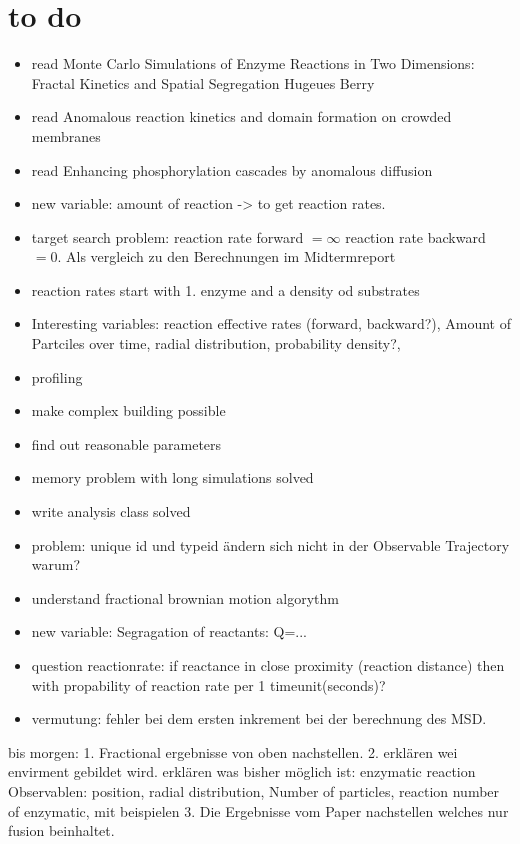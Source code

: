 \documentclass[
  a4paper,BCOR10mm,oneside,
  bibtotoc,idxtotoc,
  headsepline,footsepline,%
  fleqn,openbib
]{scrbook}
\begin{document}
\section{to do}
\begin{itemize}
 \item read Monte Carlo Simulations of Enzyme Reactions in Two Dimensions:
Fractal Kinetics and Spatial Segregation Hugeues Berry
 \item read Anomalous reaction kinetics and domain formation on crowded membranes
 \item read Enhancing phosphorylation cascades by anomalous diffusion
 \item new variable: amount of reaction -> to get reaction rates.
 \item target search problem: reaction rate forward $= \infty$ reaction rate backward $=0$. Als vergleich zu den Berechnungen im Midtermreport
 \item reaction rates start with 1. enzyme and a density od substrates
 \item Interesting variables: reaction effective rates (forward, backward?), Amount of Partciles over time, radial distribution, probability density?,
 \item profiling
 \item make complex building possible
 \item find out reasonable parameters
 \item memory problem with long simulations solved
 \item write analysis class solved 
 \item problem: unique id und typeid ändern sich nicht in der Observable Trajectory warum?
 \item understand fractional brownian motion algorythm
 \item new variable: Segragation of reactants: Q=... \cite{Hellmann2011}
 \item question reactionrate: if reactance in close proximity (reaction distance) then with propability of reaction rate per 1 timeunit(seconds)?
 \item vermutung: fehler bei dem ersten inkrement bei der berechnung des MSD. 
 \end{itemize}

bis morgen:
1. Fractional ergebnisse von oben nachstellen.
2. erklären wei envirment gebildet wird.
erklären was bisher möglich ist:
enzymatic reaction
Observablen:
position,
radial distribution,
Number of particles,
reaction number of enzymatic,
mit beispielen
3. Die Ergebnisse vom Paper nachstellen welches nur  fusion beinhaltet.
\end{document}
